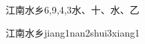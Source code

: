 \begin{entry}{江南水乡}{6,9,4,3}{⽔、⼗、⽔、⼄}
  \begin{phonetics}{江南水乡}{jiang1nan2shui3xiang1}
  \end{phonetics}
\end{entry}
